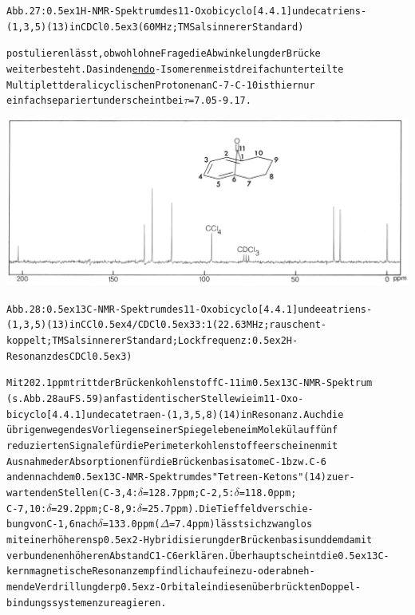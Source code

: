 \documentclass[a4paper,11pt]{article}
\begin{document}
\begin{alltt}
Abb. 27: \raise0.5ex\hbox{1}H-NMR-Spektrum des 11-Oxobicyclo[4.4.1]undecatriens-
(1,3,5) (13) in CDCl\lower0.5ex\hbox{3} (60 MHz; TMS als innerer Standard)

postulieren lässt, obwohl ohne Frage die Abwinkelung der Brücke
weiter besteht. Das in den \underline{endo}-Isomeren meist dreifach unterteilte
Multiplett der alicyclischen Protonen an C-7 - C-10 ist hier nur
einfach separiert und erscheint bei \(\tau\) = 7.05 - 9.17.

\end{alltt}
\hspace*{-0.25cm}\includegraphics[width=14.52cm]{NMR_028}
\begin{alltt}
Abb. 28: \raise0.5ex\hbox{13}C-NMR-Spektrum des 11-Oxobicyclo[4.4.1]undeeatriens-
(1,3‚5) (13) in CCl\lower0.5ex\hbox{4}/CDCl\lower0.5ex\hbox{3} 3:1 (22.63 MHz; rauschent-
koppelt; TMS als innerer Standard; Lockfrequenz: \raise0.5ex\hbox{2}H-
Resonanz des CDCl\lower0.5ex\hbox{3})

 

\newpage
{}


Mit 202.1 ppm tritt der Brückenkohlenstoff C-11 im \raise0.5ex\hbox{13}C-NMR-Spektrum
(s. Abb. 28 auF S. 59) an fast identischer Stelle wie im 11-Oxo-
bicyclo[4.4.1]undecatetraen-(1‚3,5,8) (14) in Resonanz. Auch die
übrigen wegen des Vorliegens einer Spiegelebene im Molekül auf fünf
reduzierten Signale für die Perimeterkohlenstoffe erscheinen mit
Ausnahme der Absorptionen für die Brückenbasisatome C-1 bzw. C-6
an den nach dem \raise0.5ex\hbox{13}C-NMR-Spektrum des "Tetreen-Ketons" (14) zu er-
wartenden Stellen (C-3,4: \(\delta\) = 128.7 ppm; C-2,5: \(\delta\) = 118.0 ppm;
C-7,10: \(\delta\) = 29.2 ppm; C-8‚9: \(\delta\) = 25.7 ppm). Die Tieffeldverschie-
bung von C-1,6 nach \(\delta\) = 133.0 ppm (\(\Delta\) = 7.4 ppm) lässt sich zwanglos
mit einer höheren sp\raise0.5ex\hbox{2}-Hybridisierung der Brückenbasis und dem damit
verbundenen höheren Abstand C1- C6 erklären. Überhaupt scheint die \raise0.5ex\hbox{13}C-
kernmagnetische Resonanz empfindlich auf eine zu- oder abneh-
mende Verdrillung der p\lower0.5ex\hbox{z}-Orbitale in diesen überbrückten Doppel-
bindungssystemen zu reagieren.

\end{alltt}
\end{document}
